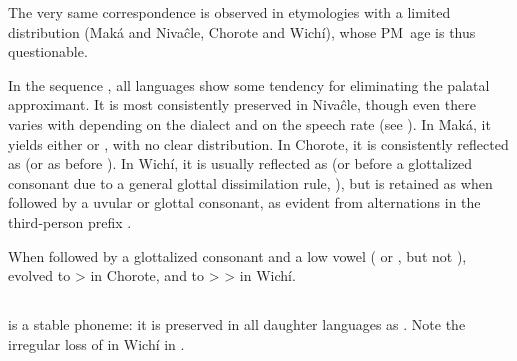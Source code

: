 The very same correspondence is observed in etymologies with a limited distribution (Maká and Nivaĉle, Chorote and Wichí), whose PM~age is thus questionable.

\begin{exe}
    \ex \spillmn
    \ex \ameiva
    \ex \grandchild
    \ex \spitmn
    \ex \siyaj
    \ex \weave
    \ex \soundv
    \ex \spillcw
    \ex \clothes
    \ex \mollef
\end{exe}

In the sequence , all languages show some tendency for eliminating the palatal approximant. It is most consistently preserved in Nivaĉle, though even there  varies with  depending on the dialect and on the speech rate (see ). In Maká, it yields either  or , with no clear distribution. In Chorote, it is consistently reflected as  (or as  before ). In Wichí, it is usually reflected as  (or  before a glottalized consonant due to a general glottal dissimilation rule, ), but is retained as  when followed by a uvular or glottal consonant, as evident from alternations in the third-person prefix \citep[241–242]{VN14}.

\begin{exe}
    \ex \dew
    \ex \wax
    \ex \water
    \ex \mancw
    \ex \hunger
    \ex \truev
    \ex \ocelot
\end{exe}

When followed by a glottalized consonant and a low vowel ( or , but not ),  evolved to  >  in Chorote, and to  >  >  in Wichí.

\begin{exe}
    \ex \jaguar
    \ex \treen
    \ex \vulture
\end{exe}

\subsection{}\label{proto-m}
 is a stable phoneme: it is preserved in all daughter languages as . Note the irregular loss of  in Wichí in .

\begin{exe}
    \ex \arrive
    \ex \wordamet
    \ex \grabwork
    \ex \whitelim
    \ex {}
    \ex \daylhuma
    \ex \interr
    \ex \sleep
    \ex \goimp
    \ex \powder
    \ex \hither
    \ex \otter
    \ex \savannahhawk
    \ex \feces
    \ex \up \label{m-up}
    \ex \dinlaw
    \ex \swallow
    \ex \rat
    \ex \dryout
    \ex \extinguished
\end{exe}

